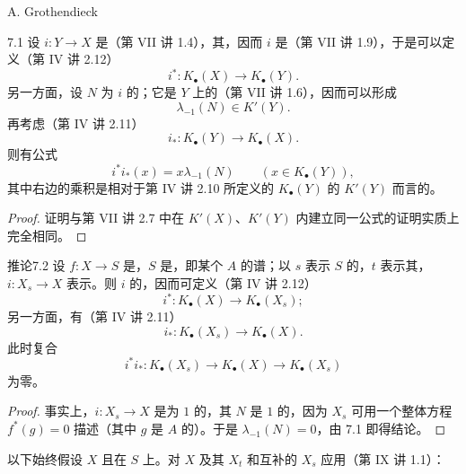 \begin{center}A. Grothendieck\end{center}
\begin{SGAresult}{}{7.1}
设 $i:Y\to X$ 是（第 VII 讲 1.4），其，因而 $i$ 是（第 VII 讲 1.9），于是可以定义（第 IV 讲 2.12）
\[i^*:K_\bullet(X)\longrightarrow K_\bullet(Y).\]
另一方面，设 $N$ 为 $i$ 的；它是 $Y$ 上的（第 VII 讲 1.6），因而可以形成
\[\lambda_{-1}(N)\in K'(Y).\]
再考虑（第 IV 讲 2.11）
\[i_*:K_\bullet(Y)\longrightarrow K_\bullet(X).\]
则有公式
\[i^*i_*(x)=x\lambda_{-1}(N)\qquad(x\in K_\bullet(Y)),\]
其中右边的乘积是相对于第 IV 讲 2.10 所定义的 $K_\bullet(Y)$ 的 $K'(Y)$ 而言的。
\end{SGAresult}
\begin{proof}
证明与第 VII 讲 2.7 中在 $K'(X)$、$K'(Y)$ 内建立同一公式的证明实质上完全相同。
\end{proof}
\begin{SGAresult}{推论}{7.2}
设 $f:X\to S$ 是，$S$ 是，即某个 $A$ 的谱；以 $s$ 表示 $S$ 的，$t$ 表示其，$i:X_s\to X$ 表示。则 $i$ 的，因而可定义（第 IV 讲 2.12）
\[i^*:K_\bullet(X)\longrightarrow K_\bullet(X_s);\]
另一方面，有（第 IV 讲 2.11）
\[i_*:K_\bullet(X_s)\longrightarrow K_\bullet(X).\]
此时复合
\[i^*i_*:K_\bullet(X_s)\longrightarrow K_\bullet(X)\longrightarrow K_\bullet(X_s)\]
为零。
\end{SGAresult}
\begin{proof}
事实上，$i:X_s\to X$ 是为 $1$ 的，其 $N$ 是 $1$ 的，因为 $X_s$ 可用一个整体方程 $f^*(g)=0$ 描述（其中 $g$ 是 $A$ 的）。于是 $\lambda_{-1}(N)=0$，由 7.1 即得结论。
\end{proof}
以下始终假设 $X$ 且在 $S$ 上。对 $X$ 及其 $X_t$ 和互补的 $X_s$ 应用（第 IX 讲 1.1）：

